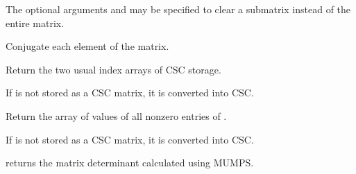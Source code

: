 \documentclass[a4paper,11pt,english]{sphinxmanual}
\begin{document}
\begin{fulllineitems}
\begin{fulllineitems}
The optional arguments  and  may be specified to clear a
sub\sphinxhyphen{}matrix instead of the entire matrix.

\end{fulllineitems}


\begin{fulllineitems}
\label{\detokenize{python/cmdref_Spmat:getfem.Spmat.conjugate}}
Conjugate each element of the matrix.

\end{fulllineitems}


\begin{fulllineitems}
\label{\detokenize{python/cmdref_Spmat:getfem.Spmat.csc_ind}}
Return the two usual index arrays of CSC storage.

If  is not stored as a CSC matrix, it is converted into CSC.

\end{fulllineitems}


\begin{fulllineitems}
\label{\detokenize{python/cmdref_Spmat:getfem.Spmat.csc_val}}
Return the array of values of all non\sphinxhyphen{}zero entries of .

If  is not stored as a CSC matrix, it is converted into CSC.

\end{fulllineitems}


\begin{fulllineitems}
\label{\detokenize{python/cmdref_Spmat:getfem.Spmat.determinant}}
returns the matrix determinant calculated using MUMPS.

\end{fulllineitems}


\end{fulllineitems}
\end{document}
